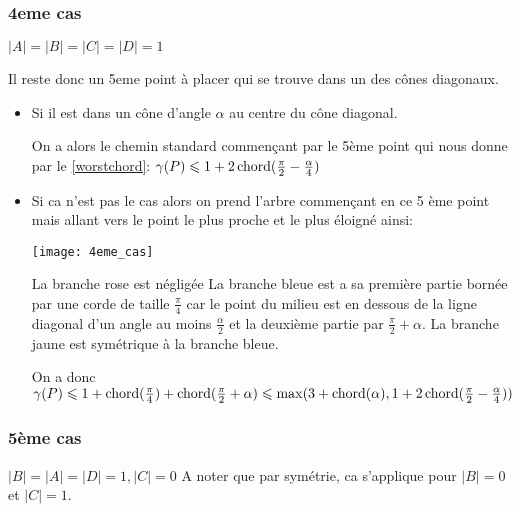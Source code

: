 \subsubsection*{4eme cas}\label{4cas} $|A| = |B| = |C| = |D| = 1$

Il reste donc un 5eme point à placer qui se trouve dans un des cônes diagonaux.

\begin{itemize}

\item \label{4cas1} Si il est dans un cône d'angle $\alpha$ au centre du cône diagonal.

On a alors le chemin standard commençant par le 5ème point qui nous donne par le \cref{worstchord}: $\gamma(P) \leqslant 1 + 2\operatorname{chord}(\frac{\pi}{2} - \frac{\alpha}{4})$

\item \label{4cas2} Si ca n'est pas le cas alors on prend l'arbre commençant en ce 5 ème point mais allant vers le point le plus proche et le plus éloigné ainsi:

  \texttt{[image: 4eme\_cas]}

La branche rose est négligée
La branche bleue est a sa première partie bornée par une corde de taille $\frac{\pi}{4}$ car le point du milieu est en dessous de la ligne diagonal d'un angle au moins $\frac{\alpha}{2}$ et la deuxième partie par $\frac{\pi}{2} + \alpha$.
La branche jaune est symétrique à la branche bleue.

On a donc $\gamma(P) \leqslant 1 + \operatorname{chord}(\frac{\pi}{4}) + \operatorname{chord}(\frac{\pi}{2} + \alpha) \leqslant \max(3 + \operatorname{chord}(\alpha), 1 + 2\operatorname{chord}(\frac{\pi}{2} - \frac{\alpha}{4}))$

\end{itemize}

\subsubsection*{5ème cas}\label{5cas} $|B| = |A| = |D| = 1, |C| = 0$
A noter que par symétrie, ca s'applique pour $|B| = 0$ et $|C| = 1$.

